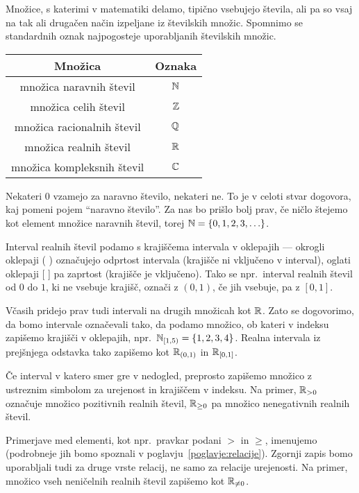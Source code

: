 Množice, s katerimi v matematiki delamo, tipično vsebujejo števila, ali pa so vsaj na tak ali drugačen način izpeljane iz številskih množic. Spomnimo se standardnih oznak najpogosteje uporabljanih številskih množic.
\begin{center}
\begin{tabular}{|cc|}
\hline
\textbf{Množica} & \textbf{Oznaka} \\
\hline
množica naravnih števil & $\mathbb{N}$ \\
množica celih števil & $\mathbb{Z}$ \\
množica racionalnih števil & $\mathbb{Q}$ \\
množica realnih števil & $\mathbb{R}$ \\
množica kompleksnih števil & $\mathbb{C}$ \\
\hline
\end{tabular}
\end{center}

Nekateri $0$ vzamejo za naravno število, nekateri ne. To je v celoti stvar dogovora, kaj pomeni pojem ``naravno število''. Za nas bo prišlo bolj prav, če ničlo štejemo kot element množice naravnih števil, torej $\NN = \set{0, 1, 2, 3, \ldots}$.

Interval realnih števil podamo s krajiščema intervala v oklepajih --- okrogli oklepaji ( ) označujejo odprtost intervala (krajišče ni vključeno v interval), oglati oklepaji [ ] pa zaprtost (krajišče je vključeno). Tako se npr.~interval realnih števil od $0$ do $1$, ki ne vsebuje krajišč, označi z $(0, 1)$, če jih vsebuje, pa z $[0, 1]$.

Včasih pridejo prav tudi intervali na drugih množicah kot $\mathbb{R}$. Zato se dogovorimo, da bomo intervale označevali tako, da podamo množico, ob kateri v indeksu zapišemo krajišči v oklepajih, npr.~$\intco[\NN]{1}{5} = \set{1, 2, 3, 4}$. Realna intervala iz prejšnjega odstavka tako zapišemo kot ${\mathbb{R}}_{(0, 1)}$ in ${\mathbb{R}}_{[0, 1]}$.

Če interval v katero smer gre v nedogled, preprosto zapišemo množico z ustreznim simbolom za urejenost in krajiščem v indeksu. Na primer, $\mathbb{R}_{> 0}$ označuje množico pozitivnih realnih števil, $\mathbb{R}_{\geq 0}$ pa množico nenegativnih realnih števil.

Primerjave med elementi, kot npr.~pravkar podani $>$ in $\geq$, imenujemo  (podrobneje jih bomo spoznali v poglavju~\ref{poglavje:relacije}). Zgornji zapis bomo uporabljali tudi za druge vrste relacij, ne samo za relacije urejenosti. Na primer, množico vseh neničelnih realnih števil zapišemo kot $\mathbb{R}_{\neq 0}$.

